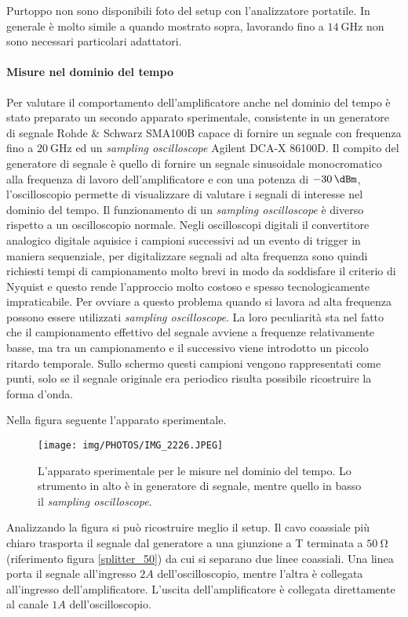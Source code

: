 \documentclass[12pt,oneside]{book}
\begin{document}
Purtoppo non sono disponibili foto del setup con l'analizzatore portatile. In generale è molto simile a quando mostrato sopra, lavorando fino a $\SI{14}{\giga\hertz}$ non sono necessari particolari adattatori.

\paragraph{Misure nel dominio del tempo}
Per valutare il comportamento dell'amplificatore anche nel dominio del tempo è stato preparato un secondo apparato sperimentale, consistente in un generatore di segnale Rohde \& Schwarz SMA100B capace di fornire un segnale con frequenza fino a $\SI{20}{\giga\hertz}$ ed un \textit{sampling oscilloscope} Agilent DCA-X 86100D.
Il compito del generatore di segnale è quello di fornire un segnale sinusoidale monocromatico alla frequenza di lavoro dell'amplificatore e con una potenza di $\SI{-30}{\dBm}$, l'oscilloscopio permette di visualizzare di valutare i segnali di interesse nel dominio del tempo.
Il funzionamento di un \textit{sampling oscilloscope} è diverso rispetto a un oscilloscopio normale. Negli oscilloscopi digitali il convertitore analogico digitale aquisice i campioni successivi ad un evento di trigger in maniera sequenziale, per digitalizzare segnali ad alta frequenza sono quindi richiesti tempi di campionamento molto brevi in modo da soddisfare il criterio di Nyquist e questo rende l'approccio molto costoso e spesso tecnologicamente impraticabile. Per ovviare a questo problema quando si lavora ad alta frequenza possono essere utilizzati \textit{sampling oscilloscope}. La loro peculiarità sta nel fatto che il campionamento effettivo del segnale avviene a frequenze relativamente basse, ma tra un campionamento e il successivo viene introdotto un piccolo ritardo temporale. Sullo schermo questi campioni vengono rappresentati come punti, solo se il segnale originale era periodico risulta possibile ricostruire la forma d'onda.

Nella figura seguente l'apparato sperimentale. 
\begin{figure}[!htbp]
    \centering
        \texttt{[image: img/PHOTOS/IMG\_2226.JPEG]}
        \caption{L'apparato sperimentale per le misure nel dominio del tempo. Lo strumento in alto è in generatore di segnale, mentre quello in basso il \textit{sampling oscilloscope}.}
\end{figure}
Analizzando la figura si può ricostruire meglio il setup. Il cavo coassiale più chiaro trasporta il segnale dal generatore a una giunzione a T terminata a $\SI{50}{\ohm}$ (riferimento figura \ref{splitter_50}) da cui si separano due linee coassiali. Una linea porta il segnale all'ingresso $2A$ dell'oscilloscopio, mentre l'altra è collegata all'ingresso dell'amplificatore. L'uscita dell'amplificatore è collegata direttamente al canale $1A$ dell'oscilloscopio.
\end{document}
